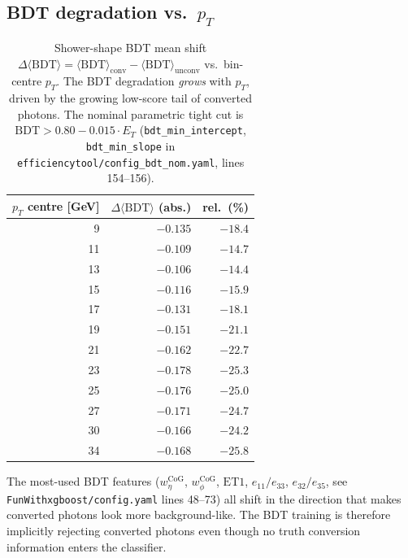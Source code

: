 \documentclass[11pt,a4paper]{article}
\newcommand{\wetacog}{\texorpdfstring{$w_{\eta}^{\mathrm{CoG}}$}{w\_eta\textasciicircum CoG}}
\newcommand{\wphicog}{\texorpdfstring{$w_{\phi}^{\mathrm{CoG}}$}{w\_phi\textasciicircum CoG}}
\begin{document}
\subsection{BDT degradation vs.\ \(p_T\)}

\begin{table}[H]
\centering
\caption{Shower-shape BDT mean shift $\Delta\langle\mathrm{BDT}\rangle =
\langle\mathrm{BDT}\rangle_{\mathrm{conv}} -
\langle\mathrm{BDT}\rangle_{\mathrm{unconv}}$ vs.\ bin-centre \(p_T\).
The BDT degradation \emph{grows} with \(p_T\), driven by the growing
low-score tail of converted photons. The nominal parametric tight cut is
$\mathrm{BDT} > 0.80 - 0.015 \cdot E_T$
(\texttt{bdt\_min\_intercept}, \texttt{bdt\_min\_slope} in
\texttt{efficiencytool/config\_bdt\_nom.yaml}, lines 154--156).
}
\label{tab:bdt_vs_pt}
\begin{tabular}{rrr}
\toprule
\(p_T\) centre [GeV] & $\Delta\langle\mathrm{BDT}\rangle$ (abs.) & rel.\ (\%) \\
\midrule
 9  & $-0.135$ & $-18.4$ \\
11  & $-0.109$ & $-14.7$ \\
13  & $-0.106$ & $-14.4$ \\
15  & $-0.116$ & $-15.9$ \\
17  & $-0.131$ & $-18.1$ \\
19  & $-0.151$ & $-21.1$ \\
21  & $-0.162$ & $-22.7$ \\
23  & $-0.178$ & $-25.3$ \\
25  & $-0.176$ & $-25.0$ \\
27  & $-0.171$ & $-24.7$ \\
30  & $-0.166$ & $-24.2$ \\
34  & $-0.168$ & $-25.8$ \\
\bottomrule
\end{tabular}
\end{table}

The most-used BDT features (\wetacog, \wphicog, $\mathrm{ET1}$,
$e_{11}/e_{33}$, $e_{32}/e_{35}$, see \texttt{FunWithxgboost/config.yaml}
lines 48--73) all shift in the direction that makes converted photons look
more background-like. The BDT training is therefore implicitly rejecting
converted photons even though no truth conversion information enters the
classifier.


\end{document}
